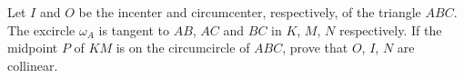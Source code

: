 Let $I$ and $O$ be the incenter and circumcenter, respectively, of the triangle $ABC$. The excircle $\omega_A$ is tangent to $AB$, $AC$ and $BC$ in $K$, $M$, $N$ respectively. If the midpoint $P$ of $KM$ is on the circumcircle of $ABC$, prove that $O$, $I$, $N$ are collinear.
